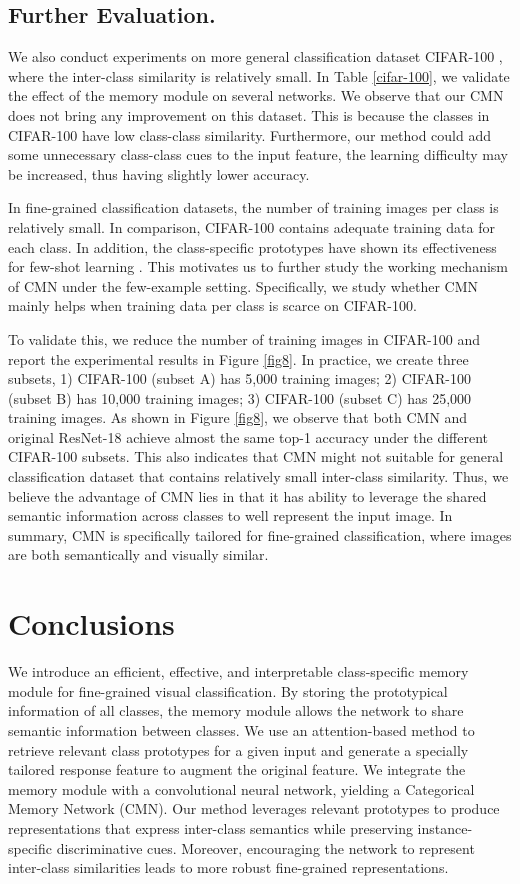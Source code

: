 \documentclass[journal]{IEEEtran}
\begin{document}
\subsection{Further Evaluation.} We also conduct experiments on more general classification dataset CIFAR-100 \cite{krizhevsky2009learning}, where the inter-class similarity is relatively small. In Table \ref{cifar-100}, we validate the effect of the memory module on several networks. We observe that our CMN does not bring any improvement on this dataset. This is because the classes in CIFAR-100 have low class-class similarity.
Furthermore, our method could add some unnecessary class-class cues to the input feature, the learning difficulty may be increased, thus having slightly lower accuracy.

In fine-grained classification datasets, the number of training images per class is relatively small. In comparison, CIFAR-100 contains adequate training data for each class. In addition, the class-specific prototypes have shown its effectiveness for few-shot learning \cite{hsu2018unsupervised,snell2017prototypical,wertheimer2019few}.
This motivates us to further study the working mechanism of CMN under the few-example setting. Specifically, we study whether CMN mainly helps when training data per class is scarce on CIFAR-100.

To validate this, we reduce the number of training images in CIFAR-100 and report the experimental results in Figure \ref{fig8}. In practice, we create three subsets, 1) CIFAR-100 (subset A) has 5,000 training images; 2) CIFAR-100 (subset B) has 10,000 training images; 3) CIFAR-100 (subset C) has 25,000 training images. 
As shown in Figure \ref{fig8}, we observe that both CMN and original ResNet-18 achieve almost the same top-1 accuracy under the different CIFAR-100 subsets. This also indicates that CMN might not suitable for general classification dataset that contains relatively small inter-class similarity.
Thus, we believe the advantage of CMN lies in that it has ability to leverage the shared semantic information across classes to well represent the input image. 
In summary, CMN is specifically tailored for fine-grained classification, where images are both semantically and visually similar.

\section{Conclusions}
We introduce an efficient, effective, and interpretable class-specific memory module for fine-grained visual classification. By storing the prototypical information of all classes, the memory module allows the network to share semantic information between classes. We use an attention-based method to retrieve relevant class prototypes for a given input and generate a specially tailored response feature to augment the original feature. We integrate the memory module with a convolutional neural network, yielding a Categorical Memory Network (CMN). Our method leverages relevant prototypes to produce representations that express inter-class semantics while preserving instance-specific discriminative cues. Moreover, encouraging the network to represent inter-class similarities leads to more robust fine-grained representations. 
\end{document}
